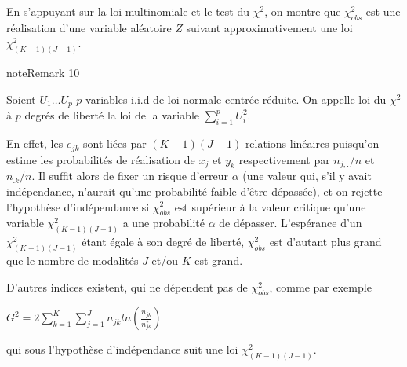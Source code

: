 \documentclass[letterpaper,10pt,english]{jupyterBook}
\begin{document}
\sphinxAtStartPar
En s’appuyant sur la loi multinomiale et le test du \(\chi^2\), on montre que \(\chi^2_{obs}\) est une réalisation d’une variable aléatoire \(Z\) suivant approximativement une loi \(\chi^2_{(K-1)(J-1)}\).
\label{statsdescriptives:remark-21}
\begin{sphinxadmonition}{note}{Remark 10}



\sphinxAtStartPar
Soient \(U_1\ldots U_p\) \(p\) variables i.i.d de loi normale centrée réduite. On appelle loi du \(\chi^2\) à \(p\) degrés de liberté la loi de la variable \(\displaystyle\sum_{i=1}^pU_i^2\).
\end{sphinxadmonition}

\sphinxAtStartPar
En effet, les \(e_{jk}\) sont liées par \((K-1)(J-1)\) relations linéaires puisqu’on estime les probabilités de réalisation de \(x_j\) et \(y_k\) respectivement par \(n_{j,.}/n\) et \(n_{.k}/n\). Il suffit alors de fixer un risque d’erreur \(\alpha\) (une valeur qui, s’il y avait indépendance, n’aurait qu’une probabilité faible d’être dépassée), et on rejette l’hypothèse d’indépendance si \(\chi^2_{obs}\)  est supérieur à la valeur critique qu’une variable \(\chi^2_{(K-1)(J-1)}\) a une probabilité \(\alpha\) de dépasser.
L’espérance d’un \(\chi^2_{(K-1)(J-1)}\) étant égale à son degré de liberté, \(\chi^2_{obs}\) est d’autant plus grand que le nombre de modalités \(J\) et/ou \(K\) est grand.

\sphinxAtStartPar
D’autres indices existent, qui ne dépendent pas de \(\chi^2_{obs}\), comme par exemple

\sphinxAtStartPar
\(\begin{equation} G^2 = 2\displaystyle\sum_{k=1}^K\displaystyle\sum_{j=1}^J n_{jk} ln \left (\frac{ n_{jk}}{ n^*_{jk}} \right )\end{equation}\)

\sphinxAtStartPar
qui sous l’hypothèse d’indépendance suit une loi \(\chi^2_{(K-1)(J-1)}\).
\end{document}
